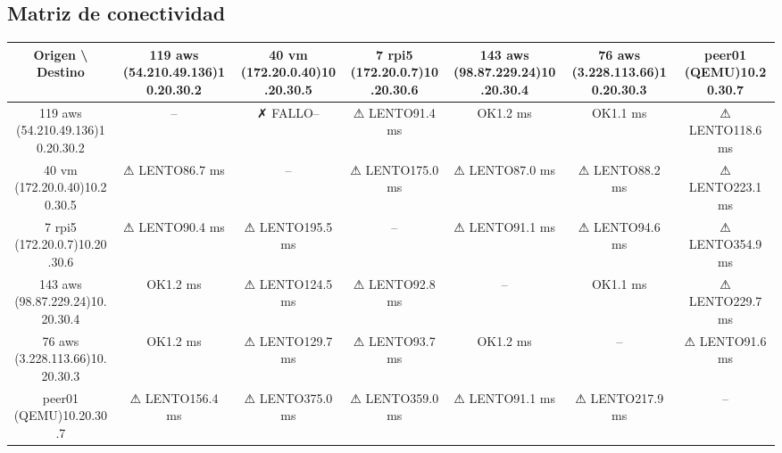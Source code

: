 \documentclass[11pt,a4paper]{article}
\begin{document}
\subsection{Matriz de conectividad}
\begin{longtable}{|c|c|c|c|c|c|c|}
\hline
Origen \textbackslash{} Destino & 119 aws (54.210.49.136)10.20.30.2 & 40 vm (172.20.0.40)10.20.30.5 & 7 rpi5 (172.20.0.7)10.20.30.6 & 143 aws (98.87.229.24)10.20.30.4 & 76 aws (3.228.113.66)10.20.30.3 & peer01 (QEMU)10.20.30.7 \\ \hline
119 aws (54.210.49.136)10.20.30.2 & -- & ✗ FALLO-- & ⚠ LENTO91.4 ms & OK1.2 ms & OK1.1 ms & ⚠ LENTO118.6 ms \\ \hline
40 vm (172.20.0.40)10.20.30.5 & ⚠ LENTO86.7 ms & -- & ⚠ LENTO175.0 ms & ⚠ LENTO87.0 ms & ⚠ LENTO88.2 ms & ⚠ LENTO223.1 ms \\ \hline
7 rpi5 (172.20.0.7)10.20.30.6 & ⚠ LENTO90.4 ms & ⚠ LENTO195.5 ms & -- & ⚠ LENTO91.1 ms & ⚠ LENTO94.6 ms & ⚠ LENTO354.9 ms \\ \hline
143 aws (98.87.229.24)10.20.30.4 & OK1.2 ms & ⚠ LENTO124.5 ms & ⚠ LENTO92.8 ms & -- & OK1.1 ms & ⚠ LENTO229.7 ms \\ \hline
76 aws (3.228.113.66)10.20.30.3 & OK1.2 ms & ⚠ LENTO129.7 ms & ⚠ LENTO93.7 ms & OK1.2 ms & -- & ⚠ LENTO91.6 ms \\ \hline
peer01 (QEMU)10.20.30.7 & ⚠ LENTO156.4 ms & ⚠ LENTO375.0 ms & ⚠ LENTO359.0 ms & ⚠ LENTO91.1 ms & ⚠ LENTO217.9 ms & -- \\ \hline
\end{longtable}
\end{document}
